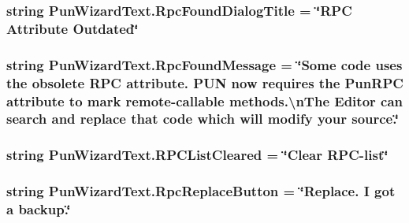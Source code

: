 \subsubsection[{\texorpdfstring{Rpc\+Found\+Dialog\+Title}{RpcFoundDialogTitle}}]{\setlength{\rightskip}{0pt plus 5cm}string Pun\+Wizard\+Text.\+Rpc\+Found\+Dialog\+Title = \char`\"{}R\+PC Attribute Outdated\char`\"{}}\hypertarget{class_pun_wizard_text_aafdf8966fc6e4461a8a03c6bc0489aca}{}\label{class_pun_wizard_text_aafdf8966fc6e4461a8a03c6bc0489aca}
\subsubsection[{\texorpdfstring{Rpc\+Found\+Message}{RpcFoundMessage}}]{\setlength{\rightskip}{0pt plus 5cm}string Pun\+Wizard\+Text.\+Rpc\+Found\+Message = \char`\"{}Some code uses the obsolete R\+PC attribute. P\+UN now requires the {\bf Pun\+R\+PC} attribute to mark remote-\/callable methods.\textbackslash{}n\+The Editor can search and replace that code which will modify your source.\char`\"{}}\hypertarget{class_pun_wizard_text_a08d2f13d94fb1fe3f7e82954fce4688d}{}\label{class_pun_wizard_text_a08d2f13d94fb1fe3f7e82954fce4688d}
\subsubsection[{\texorpdfstring{R\+P\+C\+List\+Cleared}{RPCListCleared}}]{\setlength{\rightskip}{0pt plus 5cm}string Pun\+Wizard\+Text.\+R\+P\+C\+List\+Cleared = \char`\"{}Clear R\+PC-\/list\char`\"{}}\hypertarget{class_pun_wizard_text_a089960fd554d43f35d1cf51a320bdd99}{}\label{class_pun_wizard_text_a089960fd554d43f35d1cf51a320bdd99}
\subsubsection[{\texorpdfstring{Rpc\+Replace\+Button}{RpcReplaceButton}}]{\setlength{\rightskip}{0pt plus 5cm}string Pun\+Wizard\+Text.\+Rpc\+Replace\+Button = \char`\"{}Replace. I got a backup.\char`\"{}}\hypertarget{class_pun_wizard_text_a7f737e36d4f8b456141eb1871df1dd52}{}\label{class_pun_wizard_text_a7f737e36d4f8b456141eb1871df1dd52}
